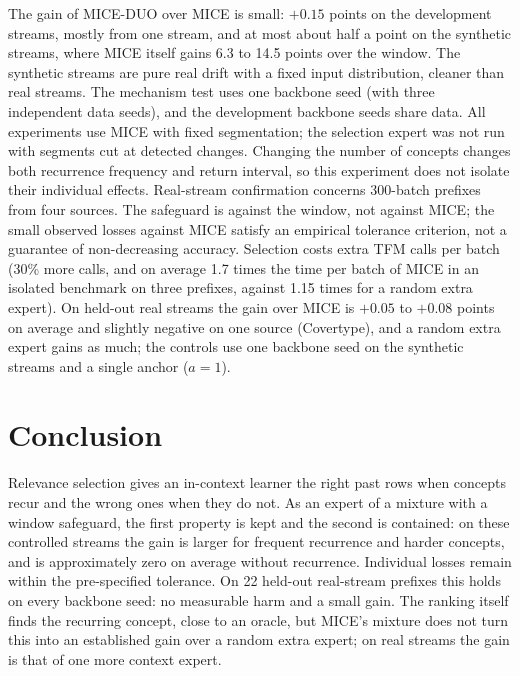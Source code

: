\documentclass{article}
\theoremstyle{plain}
\theoremstyle{definition}
\theoremstyle{remark}
\newcommand{\mice}{\textsc{MICE}}
\newcommand{\method}{\textsc{MICE-DUO}}
\begin{document}
The gain of \method{} over \mice{} is small: $+0.15$ points on the development streams, mostly from one stream, and at
most about half a point on the synthetic streams, where \mice{} itself gains 6.3 to 14.5 points over the window. The
synthetic streams are pure real drift with a fixed input distribution, cleaner than real streams. The mechanism test
uses one backbone seed (with three independent data seeds), and the development backbone seeds share data.
All experiments use \mice{} with fixed segmentation; the selection expert was not run with segments cut at
detected changes. Changing the number of concepts changes both recurrence frequency and return interval, so this experiment does
not isolate their individual effects. Real-stream confirmation concerns 300-batch prefixes from four sources.
The safeguard is against the window, not against \mice{}; the small observed losses against \mice{} satisfy
an empirical tolerance criterion, not a guarantee of non-decreasing accuracy.
Selection costs extra TFM calls per batch (30\% more calls, and on average 1.7 times the time per batch of \mice{}
in an isolated benchmark on three prefixes, against 1.15 times for a random extra expert). On held-out real streams the gain over \mice{} is $+0.05$ to $+0.08$ points on average and slightly negative on
one source (Covertype), and a random extra expert gains as much; the controls use one backbone seed on the synthetic
streams and a single anchor ($a=1$).

\section{Conclusion}

Relevance selection gives an in-context learner the right past rows when concepts recur and the wrong ones when they
do not. As an expert of a mixture with a window safeguard, the first property is kept and the second is contained:
on these controlled streams the gain is larger for frequent recurrence and harder concepts, and is approximately
zero on average without recurrence. Individual losses remain within the pre-specified tolerance.
On 22 held-out real-stream prefixes this holds on every backbone seed: no measurable harm and a small gain.
The ranking itself finds the recurring concept, close to an oracle, but \mice{}'s mixture does not turn this into an
established gain over a random extra expert; on real streams the gain is that of one more context expert.



\end{document}
